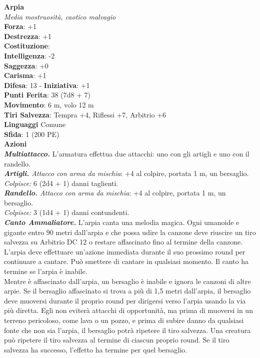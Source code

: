 \begin{multicols}{2}
\medskip\textbf{Arpia}\\
\emph{Media mostruosità, caotico malvagio}\\
\textbf{Forza}: +1\\
\textbf{Destrezza}: +1\\
\textbf{Costituzione}: \\\textbf{Intelligenza}: -2\\
\textbf{Saggezza}: +0\\
\textbf{Carisma}: +1\\
\textbf{Difesa}: 13 - \textbf{Iniziativa}: +1\\
\textbf{Punti Ferita}: 38 (7d8 + 7)\\
\textbf{Movimento}: 6 m, volo 12 m\\
\textbf{Tiri Salvezza}: Tempra +4, Riflessi +7, Arbitrio +6\\
\textbf{Linguaggi} Comune\\
\textbf{Sfida}: 1 (200 PE)\smallskip\\
\smallskip\textbf{Azioni}\\
\emph{\textbf{Multiattacco.}} L'armatura effettua due attacchi: uno con gli artigli e uno con il randello.\\
\emph{\textbf{Artigli.} Attacco con arma da mischia}: +4 al colpire, portata 1 m, un bersaglio.\\
\emph{Colpisce:} 6 (2d4 + 1) danni taglienti.\\
\emph{\textbf{Randello.} Attacco con arma da mischia}: +4 al colpire, portata 1 m, un bersaglio.\\
\emph{Colpisce:} 3 (1d4 + 1) danni contundenti.\\
\emph{\textbf{Canto Ammaliatore.}} L'arpia canta una melodia magica. Ogni umanoide e gigante entro 90 metri dall'arpia e che possa udire la canzone deve riuscire un tiro salvezza su Arbitrio DC  12 o restare affascinato fino al termine della canzone. L'arpia deve effettuare un'azione immediata durante il suo prossimo round per continuare a cantare. Può smettere di cantare in qualsiasi momento. Il canto ha termine se l'arpia è inabile.\\
Mentre è affascinato dall'arpia, un bersaglio è inabile e ignora le canzoni di altre arpie. Se il bersaglio affascinato si trova a più di 1,5 metri dall'arpia, il bersaglio deve muoversi durante il proprio round per dirigersi verso l'arpia usando la via più diretta. Egli non eviterà attacchi di opportunità, ma prima di muoversi in un terreno pericoloso, come lava o un pozzo, e prima di subire danno da qualsiasi fonte che non sia l'arpia, il bersaglio potrà ripetere il tiro salvezza. Una creatura può ripetere il tiro salvezza al termine di ciascun proprio round. Se il tiro salvezza ha successo, l'effetto ha termine per quel bersaglio.\\

\end{multicols}
